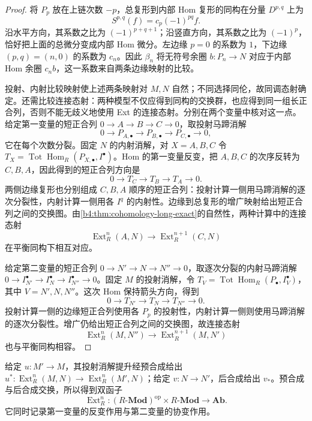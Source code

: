 \begin{proof}
	将 \(P_p\) 放在上链次数 \(-p\)，总复形到内部 Hom 复形的同构在分量 \(D^{p,q}\) 上为
	\[
		S^{p,q}(f)=c_p(-1)^{pq}f.
	\]
	沿水平方向，其系数之比为 \((-1)^{p+q+1}\)；沿竖直方向，其系数之比为 \((-1)^p\)，恰好把上面的总微分变成内部 Hom 微分。左边缘 \(p=0\) 的系数为 \(1\)，下边缘 \((p,q)=(n,0)\) 的系数为 \(c_n\)。因此 \(\beta_n\) 将无符号余圈 \(b:P_n\to N\) 对应于内部 Hom 余圈 \(c_nb\)，这一系数来自两条边缘映射的比较。

	投射、内射比较映射使上述两条映射对 \(M,N\) 自然；不同选择同伦，故同调态射确定。还需比较连接态射：两种模型不仅应得到同构的交换群，也应得到同一组长正合列，否则不能无歧义地使用 Ext 的连接态射。分别在两个变量中核对这一点。给定第一变量的短正合列 \(0\to A\to B\to C\to0\)，取投射马蹄消解
	\[
		0\longrightarrow P_{A,\bullet}\longrightarrow P_{B,\bullet} \longrightarrow P_{C,\bullet}\longrightarrow0,
	\]
	它在每个次数分裂。固定 \(N\) 的内射消解，对 \(X=A,B,C\) 令 \(T_X=\operatorname{Tot}\operatorname{Hom}_R(P_{X,\bullet},I^\bullet)\)。Hom 的第一变量反变，把 \(A,B,C\) 的次序反转为 \(C,B,A\)，因此得到的短正合列方向是
	\[
		0\longrightarrow T_C\longrightarrow T_B\longrightarrow T_A\longrightarrow0.
	\]
	两侧边缘复形也分别组成 \(C,B,A\) 顺序的短正合列：投射计算一侧用马蹄消解的逐次分裂性，内射计算一侧用各 \(I^q\) 的内射性。边缘到总复形的增广映射给出短正合列之间的交换图。由\cref{b4:thm:cohomology-long-exact}的自然性，两种计算中的连接态射
	\[
		\operatorname{Ext}_R^n(A,N)\longrightarrow\operatorname{Ext}_R^{n+1}(C,N)
	\]
	在平衡同构下相互对应。

	给定第二变量的短正合列 \(0\to N'\to N\to N''\to0\)，取逐次分裂的内射马蹄消解 \(0\to I_{N'}^\bullet\to I_N^\bullet\to I_{N''}^\bullet\to0\)。固定 \(M\) 的投射消解，令 \(T_V=\operatorname{Tot}\operatorname{Hom}_R(P_\bullet,I_V^\bullet)\)，其中 \(V=N',N,N''\)。这次 Hom 保持箭头方向，得到
	\[
		0\longrightarrow T_{N'}\longrightarrow T_N\longrightarrow T_{N''}\longrightarrow0.
	\]
	投射计算一侧的边缘短正合列使用各 \(P_p\) 的投射性，内射计算一侧则使用马蹄消解的逐次分裂性。增广仍给出短正合列之间的交换图，故连接态射
	\[
		\operatorname{Ext}_R^n(M,N'')\longrightarrow\operatorname{Ext}_R^{n+1}(M,N')
	\]
	也与平衡同构相容。
\end{proof}

给定 \(u:M'\to M\)，其投射消解提升经预合成给出 \(u^*:\operatorname{Ext}_R^n(M,N)\to\operatorname{Ext}_R^n(M',N)\)；给定 \(v:N\to N'\)，后合成给出 \(v_*\)。预合成与后合成交换，所以得到双函子
\[
	\operatorname{Ext}_R^n: (R\text{-}\mathbf{Mod})^{\mathrm{op}}\times R\text{-}\mathbf{Mod} \longrightarrow\mathbf{Ab}.
\]
它同时记录第一变量的反变作用与第二变量的协变作用。

